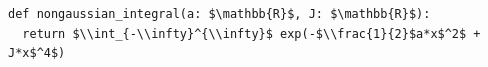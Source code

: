 \documentclass[border=10pt]{standalone}
\begin{document}
\begin{lstlisting}
def nongaussian_integral(a: $\mathbb{R}$, J: $\mathbb{R}$):
  return $\\int_{-\\infty}^{\\infty}$ exp(-$\\frac{1}{2}$a*x$^2$ + J*x$^4$)
\end{lstlisting}
\end{document}
